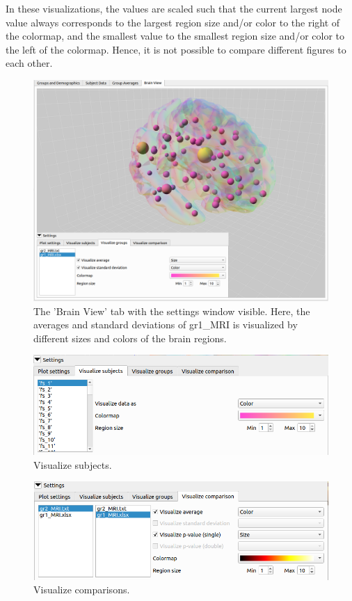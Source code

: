 \documentclass{article}
\begin{document}
In these visualizations, the values are scaled such that the current largest node value always corresponds to the largest region size and/or color to the right of the colormap, and the smallest value to the smallest region size and/or color to the left of the colormap. Hence, it is not possible to compare different figures to each other.

\begin{figure}[H]
    \centering
    \includegraphics[width=0.9\linewidth]{cohort_vis_groups.png}
    \caption{The 'Brain View' tab with the settings window visible. Here, the averages and standard deviations of gr1\_MRI is visualized by different sizes and colors of the brain regions.}
    \label{fig:cohort_vis_groups}
\end{figure}

\begin{figure}[H]
    \centering
    \includegraphics[width=0.7\linewidth]{cohort_vis_sub.png}
    \caption{Visualize subjects.}
    \label{fig:cohort_vis_sub}
\end{figure}

\begin{figure}[H]
    \centering
    \includegraphics[width=0.7\linewidth]{cohort_vis_comp.png}
    \caption{Visualize comparisons.}
    \label{fig:cohort_vis_comp}
\end{figure}
\end{document}
